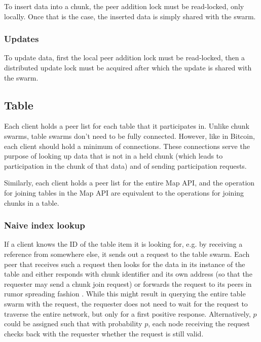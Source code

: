 \documentclass{article}
\begin{document}
To insert data into a chunk, the peer addition lock must be read-locked, only 
locally. Once that is the case, the inserted data is simply shared with the 
swarm.

\subsubsection{Updates}

To update data, first the local peer addition lock must be read-locked, then a 
distributed update lock must be acquired after which the update is shared with 
the swarm.

\subsection{Table}

Each client holds a peer list for each table that it participates in. Unlike
chunk swarms, table swarms don't need to be fully connected. However, like in
Bitcoin, each client should hold a minimum of connections. These connections
serve the purpose of looking up data that is not in a held chunk (which leads
to participation in the chunk of that data) and of sending participation
requests. 

Similarly, each client holds a peer list for the entire Map API, and the
operation for joining tables in the Map API are equivalent to the operations for
joining chunks in a table.

\subsubsection{Naive index lookup}

If a client knows the ID of the table item it is looking for, e.g. by receiving
a reference from somewhere else, it sends out a request to the table swarm. Each
peer that receives such a request then looks for the data in its instance of the
table and either responds with chunk identifier and its own address (so that the
requester may send a chunk join request) or forwards the request to its peers in
rumor spreading fashion \cite{bitcoin}. While this might result in querying the
entire table swarm with the request, the requester does not need to wait for the
request to traverse the entire network, but only for a first positive response.
Alternatively, $p$ could be assigned such that with probability $p$, each node
receiving the request checks back with the requester whether the request is
still valid.
\end{document}

